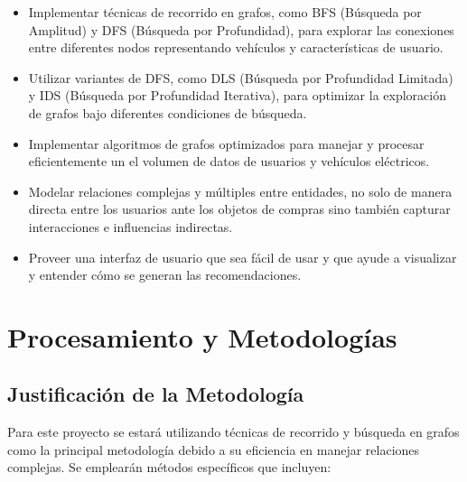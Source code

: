 \documentclass[12pt]{article}
\begin{document}
\begin{itemize}
    \item Implementar técnicas de recorrido en grafos, como BFS (Búsqueda por Amplitud) y DFS (Búsqueda por Profundidad), para explorar las conexiones entre diferentes nodos representando vehículos y características de usuario.
    \item Utilizar variantes de DFS, como DLS (Búsqueda por Profundidad Limitada) y IDS (Búsqueda por Profundidad Iterativa), para optimizar la exploración de grafos bajo diferentes condiciones de búsqueda.
    \item Implementar algoritmos de grafos optimizados para manejar y procesar eficientemente un el volumen de datos de usuarios y vehículos eléctricos.
    \item Modelar relaciones complejas y múltiples entre entidades, no solo de manera directa entre los usuarios ante los objetos de compras sino también capturar interacciones e influencias indirectas.
    \item Proveer una interfaz de usuario que sea fácil de usar y que ayude a visualizar y entender cómo se generan las recomendaciones.
\end{itemize}

\section{Procesamiento y Metodologías}

\subsection{Justificación de la Metodología}


Para este proyecto se estará utilizando técnicas de recorrido y búsqueda en grafos como la principal metodología debido a su eficiencia en manejar relaciones complejas. Se emplearán métodos específicos que incluyen:
\end{document}
